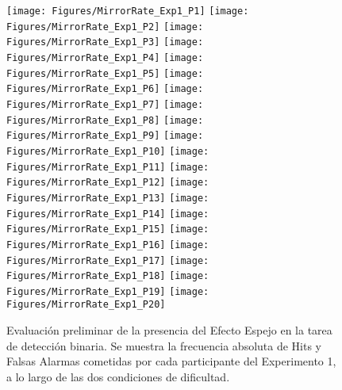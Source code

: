 \begin{figure}[th]
\centering
\texttt{[image: Figures/MirrorRate\_Exp1\_P1]} \texttt{[image: Figures/MirrorRate\_Exp1\_P2]} \texttt{[image: Figures/MirrorRate\_Exp1\_P3]}
\texttt{[image: Figures/MirrorRate\_Exp1\_P4]} \texttt{[image: Figures/MirrorRate\_Exp1\_P5]} \texttt{[image: Figures/MirrorRate\_Exp1\_P6]}
\texttt{[image: Figures/MirrorRate\_Exp1\_P7]} \texttt{[image: Figures/MirrorRate\_Exp1\_P8]} \texttt{[image: Figures/MirrorRate\_Exp1\_P9]}
\texttt{[image: Figures/MirrorRate\_Exp1\_P10]} \texttt{[image: Figures/MirrorRate\_Exp1\_P11]} \texttt{[image: Figures/MirrorRate\_Exp1\_P12]}
\texttt{[image: Figures/MirrorRate\_Exp1\_P13]} \texttt{[image: Figures/MirrorRate\_Exp1\_P14]} \texttt{[image: Figures/MirrorRate\_Exp1\_P15]}
\texttt{[image: Figures/MirrorRate\_Exp1\_P16]} \texttt{[image: Figures/MirrorRate\_Exp1\_P17]} \texttt{[image: Figures/MirrorRate\_Exp1\_P18]}
\texttt{[image: Figures/MirrorRate\_Exp1\_P19]} \texttt{[image: Figures/MirrorRate\_Exp1\_P20]} 
\caption[Hits y Falsas Alarmas entre condiciones; Experimento 1]{Evaluación preliminar de la presencia del Efecto Espejo en la tarea de detección binaria. Se muestra la frecuencia absoluta de Hits y Falsas Alarmas cometidas por cada participante del Experimento 1, a lo largo de las dos condiciones de dificultad.}
\label{fig:MRate_E1}
\end{figure}

